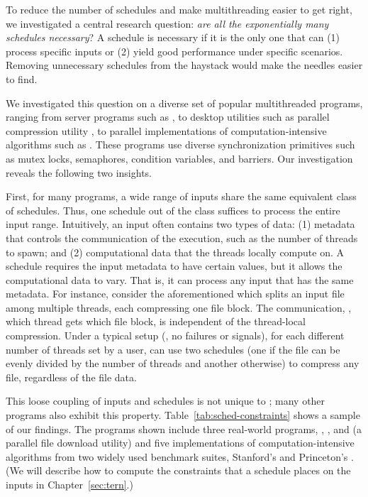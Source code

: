 To reduce the number of schedules and make multithreading easier to get right,
we investigated a central research question: \emph{are all the exponentially
many schedules necessary}?  A schedule is necessary if it is the only one
that can (1) process specific inputs or (2) yield good performance under
specific scenarios. Removing unnecessary schedules from the haystack would
make the needles easier to find.

We investigated this question on a diverse set of popular multithreaded
programs, ranging from server programs such as \apache, to desktop utilities
such as parallel compression utility \pbzip, to parallel implementations of
computation-intensive algorithms such as \fft.  These programs use diverse
synchronization primitives such as mutex locks, semaphores, condition variables,
and barriers.  Our investigation reveals the following two insights.

First, for many programs, a wide range of inputs share the same equivalent
class of schedules.  Thus, one schedule out of the class suffices to
process the entire input range.  Intuitively, an input often contains two
types of data: (1) metadata that controls the communication of the
execution, such as the number of threads to spawn; and (2) computational
data that the threads locally compute on.  A schedule requires the input
metadata to have certain values, but it allows the computational data to vary.
That is, it can process any input that has the same metadata.  For instance,
consider the aforementioned \pbzip which splits an input file
among multiple threads, each compressing one file block.  The
communication, \ie, which thread gets which file block, is independent of
the thread-local compression. Under a typical setup (\eg, no 
failures or signals), for each different number of threads set by a user, \pbzip
can use two schedules (one if the file can be evenly divided by the number of
threads and another otherwise) to compress any file, regardless of the file
data.

This loose coupling of inputs and schedules is not unique to \pbzip; many
other programs also exhibit this property.
Table~\ref{tab:sched-constraints} shows a sample of our findings.  The
programs shown include three real-world programs, \apache, \pbzip, and
\aget (a parallel file download utility) and five implementations of
computation-intensive algorithms from two widely used benchmark suites,
Stanford's \splash and Princeton's \parsec. (We will describe
how to compute the constraints that a schedule places on the inputs in
Chapter~\ref{sec:tern}.)

